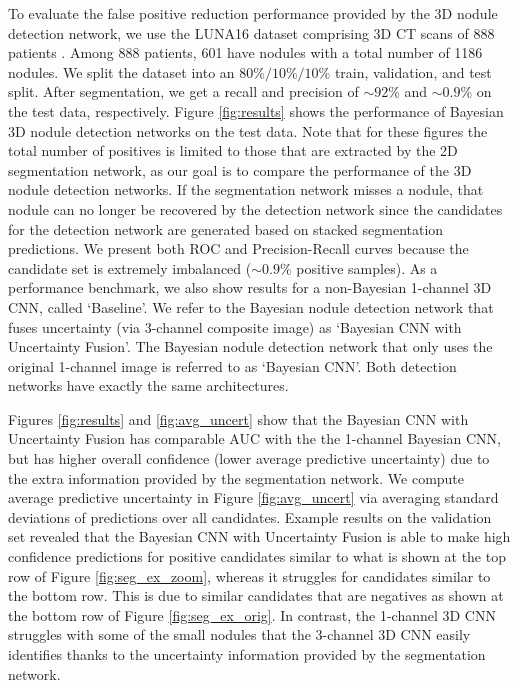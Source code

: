 \documentclass{article}
\begin{document}
To evaluate the false positive reduction performance provided by the 3D nodule detection network, we use the LUNA16 dataset comprising 3D CT scans of 888 patients \cite{luna16}. Among 888 patients, 601 have nodules with a total number of 1186 nodules. We split the dataset into an $80\%/10\%/10\%$ train, validation, and test split. After segmentation, we get a recall and precision of ${\sim}92\%$ and ${\sim}0.9\%$ on the test data, respectively. 
Figure \ref{fig:results} shows the performance of Bayesian 3D nodule detection networks on the test data. Note that for these figures the total number of positives is limited to those that are extracted by the 2D segmentation network, as our goal is to compare the performance of the 3D nodule detection networks. If the segmentation network misses a nodule, that nodule can no longer be recovered by the detection network since the candidates for the detection network are generated based on stacked segmentation predictions. We present both ROC and Precision-Recall curves because the candidate set is extremely imbalanced (${\sim}0.9\%$ positive samples). As a performance benchmark, we also show results for a non-Bayesian 1-channel 3D CNN, called `Baseline'. We refer to the Bayesian nodule detection network that fuses uncertainty (via 3-channel composite image) as `Bayesian CNN with Uncertainty Fusion'. The Bayesian nodule detection network that only uses the original 1-channel image is referred to as `Bayesian CNN'. Both detection networks have exactly the same architectures. 

Figures \ref{fig:results} and \ref{fig:avg_uncert} show that the Bayesian CNN with Uncertainty Fusion has comparable AUC with the the 1-channel Bayesian CNN, but has higher overall confidence (lower average predictive uncertainty) due to the extra information provided by the segmentation network. We compute average predictive uncertainty in Figure \ref{fig:avg_uncert} via averaging standard deviations of predictions over all candidates. Example results on the validation set revealed that the Bayesian CNN with Uncertainty Fusion is able to make high confidence predictions for positive candidates similar to what is shown at the top row of Figure \ref{fig:seg_ex_zoom}, whereas it struggles for candidates similar to the bottom row. This is due to similar candidates that are negatives as shown at the bottom row of Figure \ref{fig:seg_ex_orig}. In contrast, the 1-channel 3D CNN struggles with some of the small nodules that the 3-channel 3D CNN easily identifies thanks to the uncertainty information provided by the segmentation network. 
\end{document}
